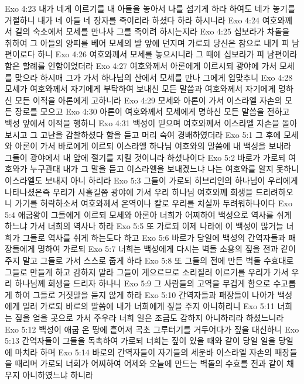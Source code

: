 Exo 4:23  내가 네게 이르기를 내 아들을 놓아서 나를 섬기게 하라 하여도 네가 놓기를 거절하니 내가 네 아들 네 장자를 죽이리라 하셨다 하라 하시니라
Exo 4:24  여호와께서 길의 숙소에서 모세를 만나사 그를 죽이려 하시는지라
Exo 4:25  십보라가 차돌을 취하여 그 아들의 양피를 베어 모세의 발 앞에 던지며 가로되 당신은 참으로 내게 피 남편이로다 하니
Exo 4:26  여호와께서 모세를 놓으시니라 그 때에 십보라가 피 남편이라 함은 할례를 인함이었더라
Exo 4:27  여호와께서 아론에게 이르시되 광야에 가서 모세를 맞으라 하시매 그가 가서 하나님의 산에서 모세를 만나 그에게 입맞추니
Exo 4:28  모세가 여호와께서 자기에게 부탁하여 보내신 모든 말씀과 여호와께서 자기에게 명하신 모든 이적을 아론에게 고하니라
Exo 4:29  모세와 아론이 가서 이스라엘 자손의 모든 장로를 모으고
Exo 4:30  아론이 여호와께서 모세에게 명하신 모든 말씀을 전하고 백성 앞에서 이적을 행하니
Exo 4:31  백성이 믿으며 여호와께서 이스라엘 자손을 돌아보시고 그 고난을 감찰하셨다 함을 듣고 머리 숙여 경배하였더라
Exo 5:1  그 후에 모세와 아론이 가서 바로에게 이르되 이스라엘 하나님 여호와의 말씀에 내 백성을 보내라 그들이 광야에서 내 앞에 절기를 지킬 것이니라 하셨나이다
Exo 5:2  바로가 가로되 여호와가 누구관대 내가 그 말을 듣고 이스라엘을 보내겠느냐 나는 여호와를 알지 못하니 이스라엘도 보내지 아니 하리라
Exo 5:3  그들이 가로되 히브리인의 하나님이 우리에게 나타나셨은즉 우리가 사흘길쯤 광야에 가서 우리 하나님 여호와께 희생을 드리려하오니 가기를 허락하소서 여호와께서 온역이나 칼로 우리를 치실까 두려워하나이다
Exo 5:4  애굽왕이 그들에게 이르되 모세와 아론아 너희가 어찌하여 백성으로 역사를 쉬게 하느냐 가서 너희의 역사나 하라
Exo 5:5  또 가로되 이제 나라에 이 백성이 많거늘 너희가 그들로 역사를 쉬게 하는도다 하고
Exo 5:6  바로가 당일에 백성의 간역자들과 패장들에게 명하여 가로되
Exo 5:7  너희는 백성에게 다시는 벽돌 소용의 짚을 전과 같이 주지 말고 그들로 가서 스스로 줍게 하라
Exo 5:8  또 그들의 전에 만든 벽돌 수효대로 그들로 만들게 하고 감하지 말라 그들이 게으르므로 소리질러 이르기를 우리가 가서 우리 하나님께 희생을 드리자 하나니
Exo 5:9  그 사람들의 고역을 무겁게 함으로 수고롭게 하여 그들로 거짓말을 듣지 않게 하라
Exo 5:10  간역자들과 패장들이 나아가 백성에게 일러 가로되 바로의 말씀에 내가 너희에게 짚을 주지 아니하리니
Exo 5:11  너희는 짚을 얻을 곳으로 가서 주우라 너희 일은 조금도 감하지 아니하리라 하셨느니라
Exo 5:12  백성이 애굽 온 땅에 흩어져 곡초 그루터기를 거두어다가 짚을 대신하니
Exo 5:13  간역자들이 그들을 독촉하여 가로되 너희는 짚이 있을 때와 같이 당일 일을 당일에 마치라 하며
Exo 5:14  바로의 간역자들이 자기들의 세운바 이스라엘 자손의 패장들을 때리며 가로되 너희가 어찌하여 어제와 오늘에 만드는 벽돌의 수효를 전과 같이 채우지 아니하였느냐 하니라
